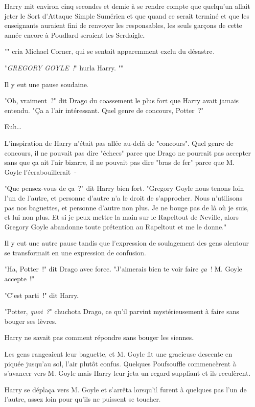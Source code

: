 Harry mit environ cinq secondes et demie à se rendre compte que quelqu'un allait jeter le Sort d'Attaque Simple Sumérien et que quand ce serait terminé et que les enseignants auraient fini de renvoyer les responsables, les seuls garçons de cette année encore à Poudlard seraient les Serdaigle.

"" cria Michael Corner, qui se sentait apparemment exclu du désastre.

"\emph{GREGORY GOYLE~!}" hurla Harry. ""

Il y eut une pause soudaine.

"Oh, vraiment~?" dit Drago du coassement le plus fort que Harry avait jamais entendu. "Ça a l'air intéressant. Quel genre de concours, Potter~?"

Euh…

L'inspiration de Harry n'était pas allée au-delà de "concours". Quel genre de concours, il ne pouvait pas dire "échecs" parce que Drago ne pourrait pas accepter sans que ça ait l'air bizarre, il ne pouvait pas dire "bras de fer" parce que M. Goyle l'écrabouillerait~-

"Que pensez-vous de ça~?" dit Harry bien fort. "Gregory Goyle nous tenons loin l'un de l'autre, et personne d'autre n'a le droit de s'approcher. Nous n'utilisons pas nos baguettes, et personne d'autre non plus. Je ne bouge pas de là où je suis, et lui non plus. Et si je peux mettre la main sur le Rapeltout de Neville, alors Gregory Goyle abandonne toute prétention au Rapeltout et me le donne."

Il y eut une autre pause tandis que l'expression de soulagement des gens alentour se transformait en une expression de confusion.

"Ha, Potter~!" dit Drago avec force. "J'aimerais bien te voir faire \emph{ça}~! M. Goyle accepte~!"

"C'est parti~!" dit Harry.

"Potter, \emph{quoi~?}" chuchota Drago, ce qu'il parvint mystérieusement à faire sans bouger ses lèvres.

Harry ne savait pas comment répondre sans bouger les siennes.

Les gens rangeaient leur baguette, et M. Goyle fit une gracieuse descente en piquée jusqu'au sol, l'air plutôt confus. Quelques Poufsouffle commencèrent à s'avancer vers M. Goyle mais Harry leur jeta un regard suppliant et ils reculèrent.

Harry se déplaça vers M. Goyle et s'arrêta lorsqu'il furent à quelques pas l'un de l'autre, assez loin pour qu'ils ne puissent se toucher.

